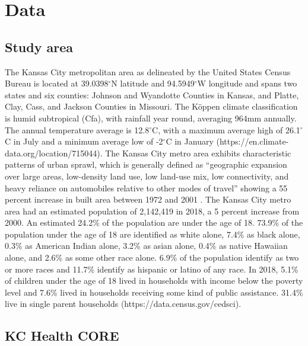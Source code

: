 
\section{Data}

\subsection{Study area}

The Kansas City metropolitan area as delineated by the United States Census Bureau is located at 39.0398$^{\circ}$N latitude and 94.5949$^{\circ}$W longitude and spans two states and six counties: Johnson and Wyandotte Counties in Kansas, and Platte, Clay, Cass, and Jackson Counties in Missouri.
The Köppen climate classification is humid subtropical (Cfa), with rainfall year round, averaging 964mm annually. The annual temperature average is 12.8$^{\circ}$C, with a maximum average high of 26.1$^{\circ}$C in July and a minimum average low of -2$^{\circ}$C in January (https://en.climate-data.org/location/715044).
The Kansas City metro area exhibits characteristic patterns of urban sprawl, which is generally defined as “geographic expansion over large areas, low-density land use, low land-use mix, low connectivity, and heavy reliance on automobiles relative to other modes of travel”  \citep{Stone2010} showing a 55 percent increase in built area between 1972 and 2001 \citep{Ji2008}.
The Kansas City metro area  had an estimated population of 2,142,419 in 2018, a 5 percent increase from 2000.
An estimated 24.2\% of the population are under the age of 18.
 73.9\% of the population under the age of 18 are identified as white alone, 7.4\% as black alone, 0.3\% as American Indian alone, 3.2\% as asian alone, 0.4\% as native Hawaiian alone, and 2.6\% as some other race alone.
 6.9\% of the population identify as two or more races and 11.7\% identify as hispanic or latino of any race.
 In 2018, 5.1\% of children under the age of 18 lived in households with income below the poverty level and 7.6\% lived in households receiving some kind of public assistance.
 31.4\% live in single parent households (https://data.census.gov/cedsci).

\subsection{KC Health CORE}

